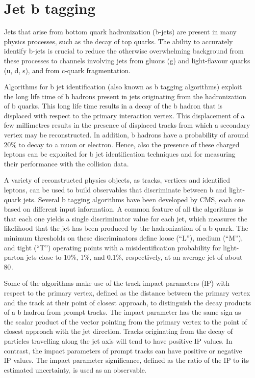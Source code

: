 \section{Jet b tagging}\label{sec:btag}

Jets that arise from bottom quark hadronization (b-jets) are present in many physics processes,
such as the decay of top quarks. The ability to accurately identify b-jets is crucial to reduce the otherwise overwhelming background from these processes to channels involving jets from gluons (g) and
light-flavour quarks (u, d, s), and from c-quark fragmentation.

Algorithms for b jet identification (also known as b tagging algorithms) exploit the long life time of b hadrons present in jets originating from the hadronization of b quarks. This long life time results in a decay of the b hadron that is displaced with respect to the primary interaction vertex. This displacement of a few millimetres results in the presence of displaced tracks from which a secondary vertex may be reconstructed. In addition, b hadrons have a probability of around 20\% to decay to a muon or electron. Hence, also the presence of these charged leptons can be exploited for b jet identification techniques and for measuring their performance with the collision data.

A variety of reconstructed physics objects, as tracks, vertices and identified leptons, can be used to build observables that discriminate between b and light-quark jets. Several b tagging algorithms have been developed by CMS, each one based on different input information. A common feature of all the algorithms is that each one yields a single discriminator value for each jet, which measures the likelihood that the jet has been produced by the hadronization of a b quark. The minimum thresholds on these discriminators define loose (``L''), medium (``M''), and tight (``T'') operating points with a misidentification probability for light-parton jets close to 10\%, 1\%, and 0.1\%, respectively, at an average jet \pt of about 80\,\GeV.

Some of the algorithms make use of the track impact parameters (IP) with respect to the primary vertex, defined as the distance between the primary vertex and the track at their point of closest approach, to distinguish the decay products of a b hadron from prompt tracks. The impact parameter has the same sign as the scalar product of the vector pointing from the primary vertex to the point of closest approach with the jet direction. Tracks originating from the decay of particles travelling along the jet axis will tend to have positive IP values. In contrast, the impact parameters of prompt tracks can have positive or negative IP values. The impact parameter significance, defined as the ratio of the IP to its estimated uncertainty, is used as an observable.

